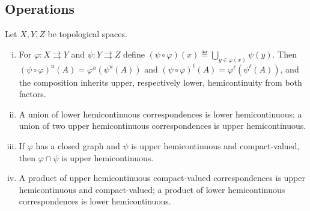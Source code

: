 \subsection{Operations}

\begin{proposition}\label{prop:corr-operations}
	Let $X,Y,Z$ be topological spaces.
	\begin{enumerate}[(i)]
		\item For $\varphi\colon X\rightrightarrows Y$ and $\psi\colon Y\rightrightarrows Z$
		      define $(\psi\circ\varphi)(x)\eqdef\bigcup_{y\in\varphi(x)}\psi(y)$. Then
		      $(\psi\circ\varphi)^{u}(A)=\varphi^{u}(\psi^{u}(A))$ and
		      $(\psi\circ\varphi)^{\ell}(A)=\varphi^{\ell}(\psi^{\ell}(A))$, and the
		      composition inherits upper, respectively lower, hemicontinuity from both
		      factors.
		\item A union of lower hemicontinuous correspondences is lower
		      hemicontinuous; a union of two upper hemicontinuous correspondences is
		      upper hemicontinuous.
		\item If $\varphi$ has a closed graph and $\psi$ is upper hemicontinuous and
		      compact-valued, then $\varphi\cap\psi$ is upper hemicontinuous.
		\item A product of upper hemicontinuous compact-valued correspondences is upper
		      hemicontinuous and compact-valued; a product of lower hemicontinuous
		      correspondences is lower hemicontinuous.
	\end{enumerate}
\end{proposition}


